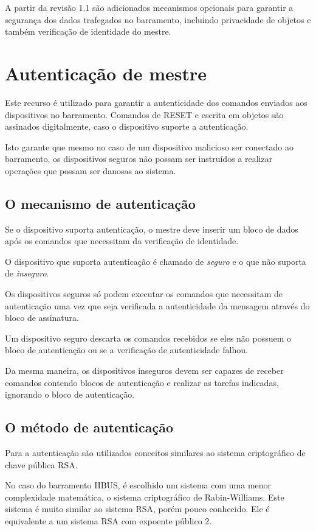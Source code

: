 A partir da revisão 1.1 são adicionados mecanismos opcionais para garantir a segurança dos dados trafegados no barramento, incluindo privacidade de objetos e também verificação de identidade do mestre.

\section{Autenticação de mestre}

Este recurso é utilizado para garantir a autenticidade dos comandos enviados aos dispositivos no barramento. Comandos de RESET e escrita em objetos são assinados digitalmente, caso o dispositivo suporte a autenticação.

Isto garante que mesmo no caso de um dispositivo malicioso ser conectado ao barramento, os dispositivos seguros não possam ser instruídos a realizar operações que possam ser danosas ao sistema.

\subsection{O mecanismo de autenticação}

Se o dispositivo suporta autenticação, o mestre deve inserir um bloco de dados após os comandos que necessitam da verificação de identidade.

O dispositivo que suporta autenticação é chamado de \textit{seguro} e o que não suporta de \textit{inseguro}.

Os dispositivos seguros só podem executar os comandos que necessitam de autenticação uma vez que seja verificada a autenticidade da mensagem através do bloco de assinatura.

Um dispositivo seguro descarta os comandos recebidos se eles não possuem o bloco de autenticação ou se a verificação de autenticidade falhou.

Da mesma maneira, os dispositivos inseguros devem ser capazes de receber comandos contendo blocos de autenticação e realizar as tarefas indicadas, ignorando o bloco de autenticação.

\subsection{O método de autenticação}

Para a autenticação são utilizados conceitos similares ao sistema criptográfico de chave pública RSA.

No caso do barramento HBUS, é escolhido um sistema com uma menor complexidade matemática, o sistema criptográfico de Rabin-Williams. Este sistema é muito similar ao sistema RSA, porém pouco conhecido. Ele é equivalente a um sistema RSA com expoente público 2.

